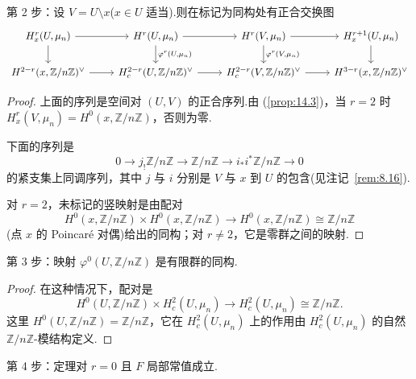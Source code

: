 第 2 步：设 $V = U \setminus x$($x \in U$ 适当).则在标记为同构处有正合交换图
\[
\begin{tikzcd}
H^{r}_{x}(U, \mu_n) \arrow[r] \arrow[d] & H^{r}(U, \mu_n) \arrow[r] \arrow[d, "{\varphi^{r}(U, \mu_n)}"] & H^{r}(V, \mu_n) \arrow[r] \arrow[d, "{\varphi^{r}(V, \mu_n)}"] & H^{r+1}_{x}(U, \mu_n) \arrow[d] \\
H^{2-r}(x, \mathbb{Z}/n\mathbb{Z})^{\vee} \arrow[r] & H^{2-r}_{c}(U, \mathbb{Z}/n\mathbb{Z})^{\vee} \arrow[r] & H^{2-r}_{c}(V, \mathbb{Z}/n\mathbb{Z})^{\vee} \arrow[r] & H^{3-r}(x, \mathbb{Z}/n\mathbb{Z})^{\vee}
\end{tikzcd}
\]

\begin{proof}
上面的序列是空间对 $(U, V)$ 的正合序列.由 (\ref{prop:14.3})，当 $r = 2$ 时 $H^{r}_{x}(V, \mu_n) = H^{0}(x, \mathbb{Z}/n\mathbb{Z})$，否则为零.

下面的序列是
\[
0 \to j_{!}\mathbb{Z}/n\mathbb{Z} \to \mathbb{Z}/n\mathbb{Z} \to i_{*}i^{*}\mathbb{Z}/n\mathbb{Z} \to 0
\]
的紧支集上同调序列，其中 $j$ 与 $i$ 分别是 $V$ 与 $x$ 到 $U$ 的包含(见注记~\ref{rem:8.16}).

对 $r = 2$，未标记的竖映射是由配对
\[
H^{0}(x, \mathbb{Z}/n\mathbb{Z}) \times H^{0}(x, \mathbb{Z}/n\mathbb{Z}) \to H^{0}(x, \mathbb{Z}/n\mathbb{Z}) \cong \mathbb{Z}/n\mathbb{Z}
\]
(点 $x$ 的 Poincar\'e 对偶)给出的同构；对 $r \neq 2$，它是零群之间的映射.
\end{proof}

第 3 步：映射 $\varphi^{0}(U, \mathbb{Z}/n\mathbb{Z})$ 是有限群的同构.

\begin{proof}
在这种情况下，配对是
\[
H^{0}(U, \mathbb{Z}/n\mathbb{Z}) \times H^{2}_{c}(U, \mu_n) \to H^{2}_{c}(U, \mu_n) \cong \mathbb{Z}/n\mathbb{Z}.
\]
这里 $H^{0}(U, \mathbb{Z}/n\mathbb{Z}) = \mathbb{Z}/n\mathbb{Z}$，它在 $H^{2}_{c}(U, \mu_n)$ 上的作用由 $H^{2}_{c}(U, \mu_n)$ 的自然 $\mathbb{Z}/n\mathbb{Z}$-模结构定义.
\end{proof}

第 4 步：定理对 $r = 0$ 且 $F$ 局部常值成立.

